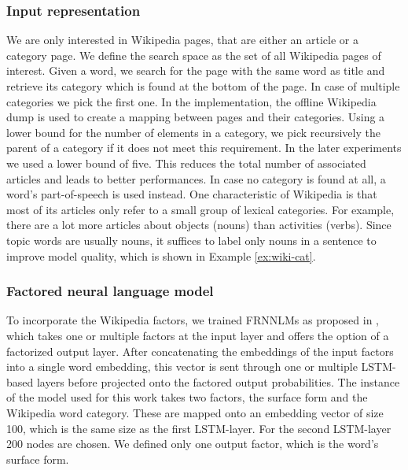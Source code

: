 \documentclass[a4paper]{article}
\begin{document}
\subsubsection{Input representation}
We are only interested in Wikipedia pages, that are either an article or a category page.
We define the search space as the set of all Wikipedia pages of interest. Given a word, we search for the page with the same word as title and retrieve its category which is found at the bottom of the page.
In case of multiple categories we pick the first one.
In the implementation, the offline Wikipedia dump is used to create a mapping between pages and their categories. Using a lower bound for the number of elements in a category, we pick recursively the parent of a category if it does not meet this requirement. In the later experiments we used a lower bound of five. This reduces the total number of associated articles and leads to better performances. In case no category is found at all, a word's part-of-speech is used instead.
One characteristic of Wikipedia is that most of its articles only refer to a small group of lexical categories. For example, there are a lot more articles about objects (nouns) than activities (verbs). Since topic words are usually nouns, it suffices to label only nouns in a sentence to improve model quality, which is shown in Example \ref{ex:wiki-cat}.

\subsubsection{Factored neural language model}
To incorporate the Wikipedia factors, we trained FRNNLMs as proposed in \cite{niehuesusing}, which takes one or multiple factors at the input layer and offers the option of a factorized output layer. After concatenating the embeddings of the input factors into a single word embedding, this vector is sent through one or multiple LSTM-based layers \cite{hochreiter1997long} before projected onto the factored output probabilities. The instance of the model used for this work takes two factors, the surface form and the Wikipedia word category. These are mapped onto an embedding vector of size 100, which is the same size as the first LSTM-layer. For the second LSTM-layer 200 nodes are chosen. We defined only one output factor, which is the word's surface form.
\end{document}
